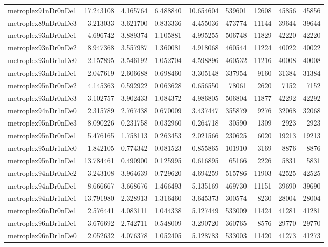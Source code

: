 \documentclass[../../../thesis.tex]{subfiles}
\begin{document}
\begin{longtable}{|l|r|r|r|r|r|r|r|r|}
metroplex91nDr0nDe1 & 17.243108 & 4.165764 & 6.488840 & 10.654604 & 539601 & 12608 & 45856 & 45856 \\
metroplex89nDr0nDe3 & 3.213033 & 3.621700 & 0.833336 & 4.455036 & 473774 & 11144 & 39644 & 39644 \\
metroplex93nDr0nDe1 & 4.696742 & 3.889374 & 1.105881 & 4.995255 & 506748 & 11829 & 42220 & 42220 \\
metroplex93nDr0nDe2 & 8.947368 & 3.557987 & 1.360081 & 4.918068 & 460544 & 11224 & 40022 & 40022 \\
metroplex93nDr1nDe0 & 2.157895 & 3.546192 & 1.052704 & 4.598896 & 460532 & 11216 & 40008 & 40008 \\
metroplex93nDr1nDe1 & 2.047619 & 2.606688 & 0.698460 & 3.305148 & 337954 & 9160 & 31384 & 31384 \\
metroplex95nDr0nDe2 & 4.145363 & 0.592922 & 0.063628 & 0.656550 & 78061 & 2620 & 7152 & 7152 \\
metroplex93nDr0nDe3 & 3.102757 & 3.902433 & 1.084372 & 4.986805 & 506804 & 11877 & 42292 & 42292 \\
metroplex94nDr1nDe0 & 2.315789 & 2.767438 & 0.670009 & 3.437447 & 355879 & 9276 & 32068 & 32068 \\
metroplex95nDr0nDe3 & 8.090226 & 0.231758 & 0.032960 & 0.264718 & 30590 & 1309 & 2923 & 2923 \\
metroplex95nDr0nDe1 & 5.476165 & 1.758113 & 0.263453 & 2.021566 & 230625 & 6020 & 19213 & 19213 \\
metroplex95nDr1nDe0 & 1.842105 & 0.774342 & 0.081523 & 0.855865 & 101910 & 3169 & 8876 & 8876 \\
metroplex95nDr1nDe1 & 13.784461 & 0.490900 & 0.125995 & 0.616895 & 65166 & 2226 & 5831 & 5831 \\
metroplex94nDr0nDe2 & 3.243108 & 3.964639 & 0.729620 & 4.694259 & 515786 & 11903 & 42525 & 42525 \\
metroplex94nDr0nDe1 & 8.666667 & 3.668676 & 1.466493 & 5.135169 & 469730 & 11151 & 39690 & 39690 \\
metroplex94nDr1nDe1 & 13.791980 & 2.328913 & 1.316460 & 3.645373 & 300574 & 8230 & 28004 & 28004 \\
metroplex96nDr0nDe1 & 2.576441 & 4.083111 & 1.044338 & 5.127449 & 533009 & 11424 & 41281 & 41281 \\
metroplex96nDr1nDe1 & 3.676692 & 2.742711 & 0.548009 & 3.290720 & 360765 & 8576 & 29770 & 29770 \\
metroplex96nDr1nDe0 & 2.052632 & 4.076378 & 1.052405 & 5.128783 & 533003 & 11420 & 41273 & 41273 \\

\end{longtable}
\end{document}
